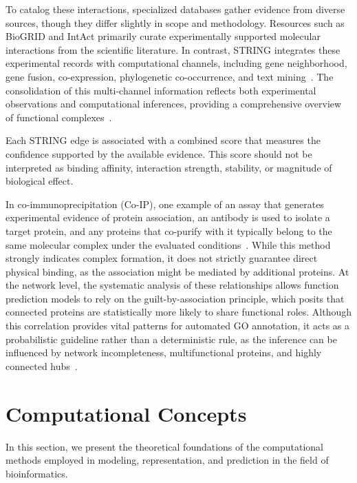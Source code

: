 \documentclass[Ingles]{ic-tese-v3}
\begin{document}
To catalog these interactions, specialized databases gather evidence from diverse sources, though they differ slightly in scope and methodology. Resources such as BioGRID and IntAct primarily curate experimentally supported molecular interactions from the scientific literature. In contrast, STRING integrates these experimental records with computational channels, including gene neighborhood, gene fusion, co-expression, phylogenetic co-occurrence, and text mining~\cite{fields1989novel, safari-alighiarloo_protein-protein_2014, szklarczyk_string_2025}. The consolidation of this multi-channel information reflects both experimental observations and computational inferences, providing a comprehensive overview of functional complexes~\cite{raman_construction_2010}.

Each STRING edge is associated with a combined score that measures the confidence supported by the available evidence. This score should not be interpreted as binding affinity, interaction strength, stability, or magnitude of biological effect.

In co-immunoprecipitation (Co-IP), one example of an assay that generates experimental evidence of protein association, an antibody is used to isolate a target protein, and any proteins that co-purify with it typically belong to the same molecular complex under the evaluated conditions~\cite{kaboord2008isolation}. While this method strongly indicates complex formation, it does not strictly guarantee direct physical binding, as the association might be mediated by additional proteins. At the network level, the systematic analysis of these relationships allows function prediction models to rely on the guilt-by-association principle, which posits that connected proteins are statistically more likely to share functional roles. Although this correlation provides vital patterns for automated GO annotation, it acts as a probabilistic guideline rather than a deterministic rule, as the inference can be influenced by network incompleteness, multifunctional proteins, and highly connected hubs~\cite{valentini2010true, koh_analyzing_2012, gillis2011impact}.


\section{Computational Concepts}

In this section, we present the theoretical foundations of the computational methods employed in modeling, representation, and prediction in the field of bioinformatics.
\end{document}
